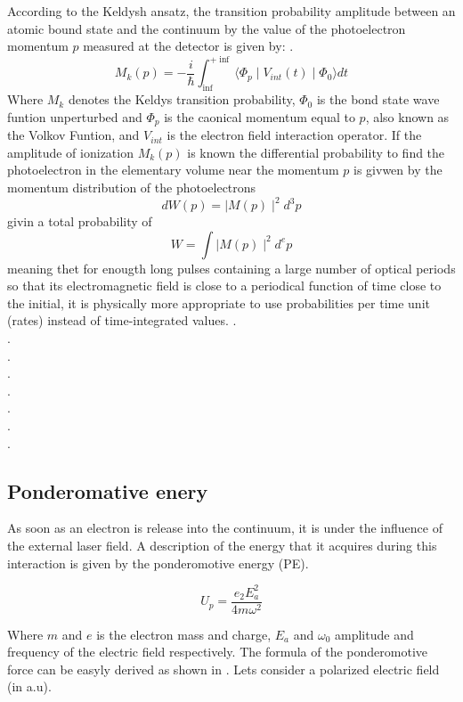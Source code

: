 According to the Keldysh ansatz, the transition probability amplitude between an atomic bound state and the continuum
 by the value of the photoelectron momentum $p$ measured at the detector is given by: \cite{popruzhenko_keldysh_2014}.
 \begin{equation}
 M_{k}(p) = -\dfrac{i}{\hbar} \int_{\inf}^{+\inf} \langle \Phi_{p}\mid  V_{int}(t)\mid \Phi_{0} \rangle dt
 \end{equation}
Where $M_{k}$ denotes the Keldys transition probability, $\Phi_{0}$ is the bond state wave funtion unperturbed and $\Phi_{p}$ is the caonical momentum equal to $p$, also known as the Volkov Funtion, and $V_{int}$ is the electron field interaction operator. 
If the amplitude of ionization $M_{k}(p)$ is known the differential
probability to find the photoelectron in the elementary volume near the momentum $p$ is givwen by the momentum distribution of the photoelectrons 
\begin{equation}
dW(p)=\mid M(p)\mid^{2} d^{3}p
\end{equation}
 givin a total probability of
 \begin{equation}
 W= \int \mid M(p)\mid^{2} d^{e}p
 \end{equation}
meaning thet for enougth long pulses containing a large number of optical
periods so that its electromagnetic field is close to a periodical function of time close to the initial, it is physically more appropriate to use probabilities per time unit (rates) instead of time-integrated values.
.\\.\\.\\.\\.\\.\\.\\.


\subsection{Ponderomative enery}


As soon as an electron is release into the continuum, it is  under the influence of the external laser field. A description of the energy that it acquires during this interaction is given by the ponderomotive energy (PE).

\begin{equation}
U_{p} = \dfrac{e_{2}E_{a}^{2}}{4m \omega^{2}}
\end{equation}

Where $m$ and $e$ is the electron mass and charge, $E_{a}$ and $\omega_{0}$  amplitude and frequency of the electric field respectively. The formula of the ponderomotive force can be easyly  derived as shown in \cite{protopapas_atomic_1997}\cite{connerade_highly_1998}. Lets consider a polarized electric field (in a.u).

